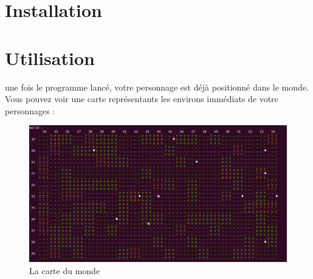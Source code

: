 \documentclass[asi]{picINSA}
\begin{document}
	
	\couverture{}

\tableofcontents{}


\chapter{Installation}



\chapter{Utilisation}
une fois le programme lancé, votre personnage est déjà positionné dans le monde. Vous pouvez voir une carte représentants les environs immédiats de votre personnages :

\begin{figure}[!ht]
  \begin{center}
    \includegraphics[width=1\textwidth]{images/screenshootCarte01.png}
    \caption{La carte du monde}	
  \end{center}
\end{figure}
\end{document}
